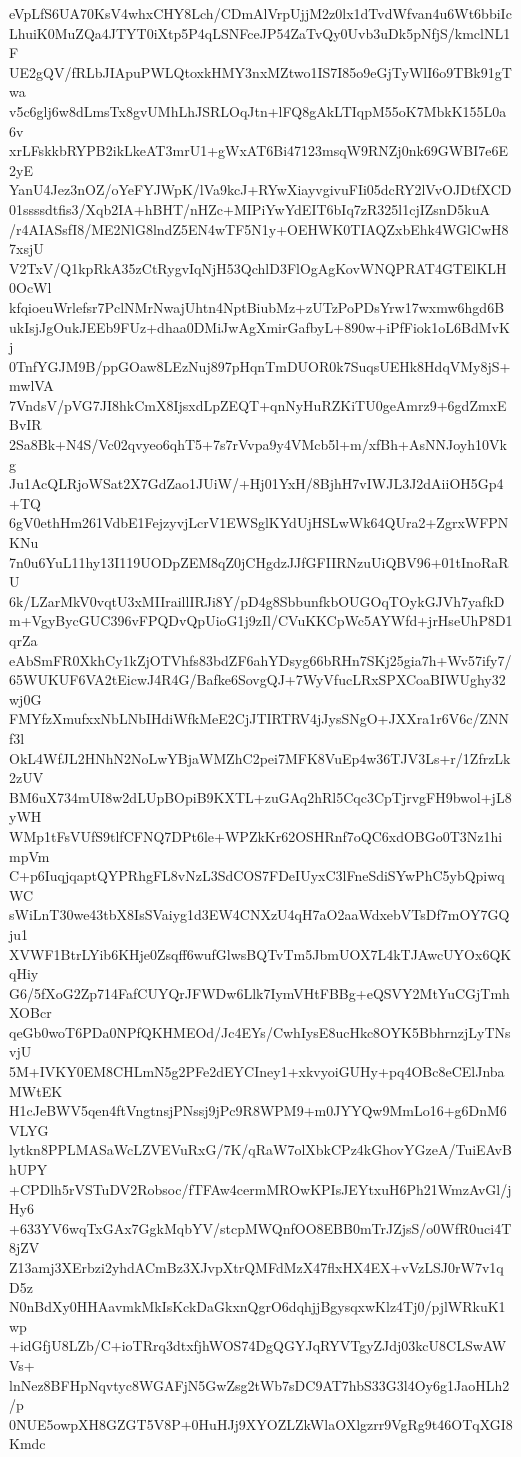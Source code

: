 eVpLfS6UA70KsV4whxCHY8Lch/CDmAlVrpUjjM2z0lx1dTvdWfvan4u6Wt6bbiIc
LhuiK0MuZQa4JTYT0iXtp5P4qLSNFceJP54ZaTvQy0Uvb3uDk5pNfjS/kmclNL1F
UE2gQV/fRLbJIApuPWLQtoxkHMY3nxMZtwo1IS7I85o9eGjTyWlI6o9TBk91gTwa
v5c6glj6w8dLmsTx8gvUMhLhJSRLOqJtn+lFQ8gAkLTIqpM55oK7MbkK155L0a6v
xrLFskkbRYPB2ikLkeAT3mrU1+gWxAT6Bi47123msqW9RNZj0nk69GWBI7e6E2yE
YanU4Jez3nOZ/oYeFYJWpK/lVa9kcJ+RYwXiayvgivuFIi05dcRY2lVvOJDtfXCD
01ssssdtfis3/Xqb2IA+hBHT/nHZc+MIPiYwYdEIT6bIq7zR325l1cjIZsnD5kuA
/r4AIASsfI8/ME2NlG8lndZ5EN4wTF5N1y+OEHWK0TIAQZxbEhk4WGlCwH87xsjU
V2TxV/Q1kpRkA35zCtRygvIqNjH53QchlD3FlOgAgKovWNQPRAT4GTElKLH0OcWl
kfqioeuWrlefsr7PclNMrNwajUhtn4NptBiubMz+zUTzPoPDsYrw17wxmw6hgd6B
ukIsjJgOukJEEb9FUz+dhaa0DMiJwAgXmirGafbyL+890w+iPfFiok1oL6BdMvKj
0TnfYGJM9B/ppGOaw8LEzNuj897pHqnTmDUOR0k7SuqsUEHk8HdqVMy8jS+mwlVA
7VndsV/pVG7JI8hkCmX8IjsxdLpZEQT+qnNyHuRZKiTU0geAmrz9+6gdZmxEBvIR
2Sa8Bk+N4S/Vc02qvyeo6qhT5+7s7rVvpa9y4VMcb5l+m/xfBh+AsNNJoyh10Vkg
Ju1AcQLRjoWSat2X7GdZao1JUiW/+Hj01YxH/8BjhH7vIWJL3J2dAiiOH5Gp4+TQ
6gV0ethHm261VdbE1FejzyvjLcrV1EWSglKYdUjHSLwWk64QUra2+ZgrxWFPNKNu
7n0u6YuL11hy13I119UODpZEM8qZ0jCHgdzJJfGFIIRNzuUiQBV96+01tInoRaRU
6k/LZarMkV0vqtU3xMIIraillIRJi8Y/pD4g8SbbunfkbOUGOqTOykGJVh7yafkD
m+VgyBycGUC396vFPQDvQpUioG1j9zIl/CVuKKCpWc5AYWfd+jrHseUhP8D1qrZa
eAbSmFR0XkhCy1kZjOTVhfs83bdZF6ahYDsyg66bRHn7SKj25gia7h+Wv57ify7/
65WUKUF6VA2tEicwJ4R4G/Bafke6SovgQJ+7WyVfucLRxSPXCoaBIWUghy32wj0G
FMYfzXmufxxNbLNbIHdiWfkMeE2CjJTIRTRV4jJysSNgO+JXXra1r6V6c/ZNNf3l
OkL4WfJL2HNhN2NoLwYBjaWMZhC2pei7MFK8VuEp4w36TJV3Ls+r/1ZfrzLk2zUV
BM6uX734mUI8w2dLUpBOpiB9KXTL+zuGAq2hRl5Cqc3CpTjrvgFH9bwol+jL8yWH
WMp1tFsVUfS9tlfCFNQ7DPt6le+WPZkKr62OSHRnf7oQC6xdOBGo0T3Nz1himpVm
C+p6IuqjqaptQYPRhgFL8vNzL3SdCOS7FDeIUyxC3lFneSdiSYwPhC5ybQpiwqWC
sWiLnT30we43tbX8IsSVaiyg1d3EW4CNXzU4qH7aO2aaWdxebVTsDf7mOY7GQju1
XVWF1BtrLYib6KHje0Zsqff6wufGlwsBQTvTm5JbmUOX7L4kTJAwcUYOx6QKqHiy
G6/5fXoG2Zp714FafCUYQrJFWDw6Llk7IymVHtFBBg+eQSVY2MtYuCGjTmhXOBcr
qeGb0woT6PDa0NPfQKHMEOd/Jc4EYs/CwhIysE8ucHkc8OYK5BbhrnzjLyTNsvjU
5M+IVKY0EM8CHLmN5g2PFe2dEYCIney1+xkvyoiGUHy+pq4OBc8eCElJnbaMWtEK
H1cJeBWV5qen4ftVngtnsjPNssj9jPc9R8WPM9+m0JYYQw9MmLo16+g6DnM6VLYG
lytkn8PPLMASaWcLZVEVuRxG/7K/qRaW7olXbkCPz4kGhovYGzeA/TuiEAvBhUPY
+CPDlh5rVSTuDV2Robsoc/fTFAw4cermMROwKPIsJEYtxuH6Ph21WmzAvGl/jHy6
+633YV6wqTxGAx7GgkMqbYV/stcpMWQnfOO8EBB0mTrJZjsS/o0WfR0uci4T8jZV
Z13amj3XErbzi2yhdACmBz3XJvpXtrQMFdMzX47flxHX4EX+vVzLSJ0rW7v1qD5z
N0nBdXy0HHAavmkMkIsKckDaGkxnQgrO6dqhjjBgysqxwKlz4Tj0/pjlWRkuK1wp
+idGfjU8LZb/C+ioTRrq3dtxfjhWOS74DgQGYJqRYVTgyZJdj03kcU8CLSwAWVs+
lnNez8BFHpNqvtyc8WGAFjN5GwZsg2tWb7sDC9AT7hbS33G3l4Oy6g1JaoHLh2/p
0NUE5owpXH8GZGT5V8P+0HuHJj9XYOZLZkWlaOXlgzrr9VgRg9t46OTqXGI8Kmdc
